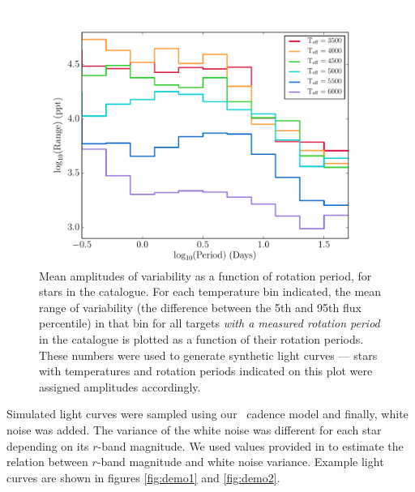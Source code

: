 \begin{figure}
\begin{center}
\includegraphics[width=6in, clip=true]{figures/amp_hist.pdf}
\caption[The mean amplitudes of variability for stars in the
\citet{Mcquillan2014} catalogue, according to their temperatures.]
{Mean amplitudes of variability as a function of rotation period, for stars
in the \citet{Mcquillan2014} catalogue.
For each temperature bin indicated, the mean range of variability (the
difference between the 5th and 95th flux percentile) in that bin for all
targets {\it with a measured rotation period} in the \citet{Mcquillan2014}
catalogue is plotted as a function of their rotation periods.
These numbers were used to generate synthetic light curves --- stars with
temperatures and rotation periods indicated on this plot were assigned
amplitudes accordingly.
}
\label{fig:amp_hist}
\end{center}
\end{figure}

Simulated light curves were sampled using our \LSST\ cadence model and
finally, white noise was added.
The variance of the white noise was different for each star depending on
its $r$-band magnitude.
We used values provided in \citet{Jacklin2015} to estimate the relation
between $r$-band magnitude and white noise variance.
Example light curves are shown in figures \ref{fig:demo1} and
\ref{fig:demo2}.

